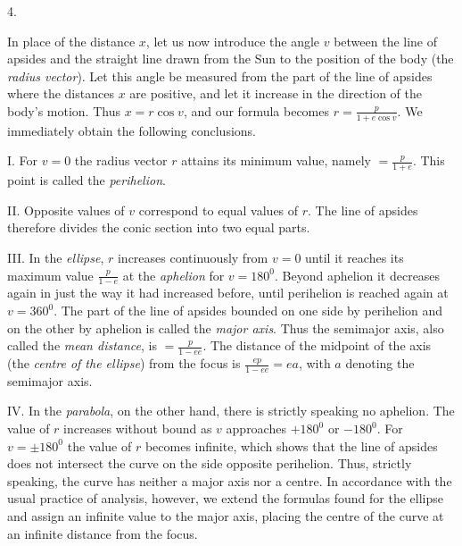 \par{}
\begin{center}
4.
\end{center}
In place of the distance $x$, let us now introduce the angle $v$ between the line of apsides and the straight line drawn from the Sun to the position of the body (the \emph{radius vector}). Let this angle be measured from the part of the line of apsides where the distances $x$ are positive, and let it increase in the direction of the body's motion. Thus $x=r\cos v$, and our formula becomes $r=\frac{p}{1+e\cos v}$. We immediately obtain the following conclusions.

I. For $v=0$ the radius vector $r$ attains its minimum value, namely $=\frac{p}{1+e}$. This point is called the \emph{perihelion}.

II. Opposite values of $v$ correspond to equal values of $r$. The line of apsides therefore divides the conic section into two equal parts.

III. In the \emph{ellipse}, $r$ increases continuously from $v=0$ until it reaches its maximum value $\frac{p}{1-e}$ at the \emph{aphelion} for $v=180^{0}$. Beyond aphelion it decreases again in just the way it had increased before, until perihelion is reached again at $v=360^{0}$. The part of the line of apsides bounded on one side by perihelion and on the other by aphelion is called the \emph{major axis}. Thus the semimajor axis, also called the \emph{mean distance}, is $=\frac{p}{1-ee}$. The distance of the midpoint of the axis (the \emph{centre of the ellipse}) from the focus is $\frac{ep}{1-ee}=ea$, with $a$ denoting the semimajor axis.

IV. In the \emph{parabola}, on the other hand, there is strictly speaking no aphelion. The value of $r$ increases without bound as $v$ approaches $+180^{0}$ or $-180^{0}$. For $v=\pm180^{0}$ the value of $r$ becomes infinite, which shows that the line of apsides does not intersect the curve on the side opposite perihelion. Thus, strictly speaking, the curve has neither a major axis nor a centre. In accordance with the usual practice of analysis, however, we extend the formulas found for the ellipse and assign an infinite value to the major axis, placing the centre of the curve at an infinite distance from the focus.

